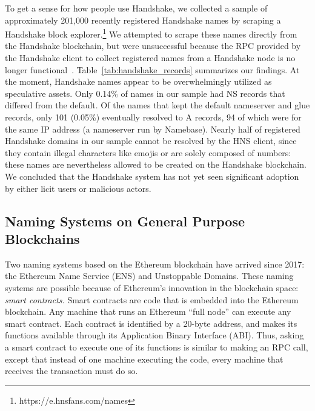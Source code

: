 
To get a sense for how people use Handshake, we collected a 
sample of approximately 201,000 recently registered Handshake 
names by scraping a Handshake block 
explorer.\footnote{https://e.hnsfans.com/names} 
We attempted to scrape these names 
directly from the Handshake blockchain, but were 
unsuccessful because the RPC 
provided by the Handshake client to collect registered names 
from a Handshake node is no 
longer functional~\cite{hns_rpc_too_big}. 
Table~\ref{tab:handshake_records} 
summarizes our findings. At the moment, Handshake names appear to be 
overwhelmingly utilized as speculative assets. Only 0.14\% of 
names in our sample had NS records that differed from the 
default. Of the names that kept the default nameserver and 
glue records, only 101 (0.05\%) eventually resolved to A records, 94 of 
which were for the same IP address (a nameserver run by Namebase). Nearly half 
of registered Handshake domains in our sample cannot be 
resolved by the HNS client, since they contain illegal characters like emojis 
or are solely composed of numbers: these names are nevertheless allowed to be 
created on the Handshake blockchain. We concluded that the Handshake system has 
not yet seen significant adoption by either licit users or malicious 
actors.

\subsection{Naming Systems on General Purpose Blockchains}

Two naming systems based on the Ethereum blockchain have 
arrived since 2017: the Ethereum Name 
Service (ENS) and Unstoppable Domains. These naming systems 
are possible because of Ethereum's innovation in the 
blockchain space: \emph{smart contracts.} Smart contracts 
are code that is embedded into the Ethereum 
blockchain. Any machine that runs an Ethereum ``full node'' 
can execute any 
smart contract. Each contract is identified by a 20-byte 
address, and makes its functions available through its 
Application Binary Interface (ABI). 
Thus, asking a smart contract to execute one of its functions 
is similar to 
making an RPC call, except that instead of one machine executing the code, 
every machine that receives the transaction must do so. 

